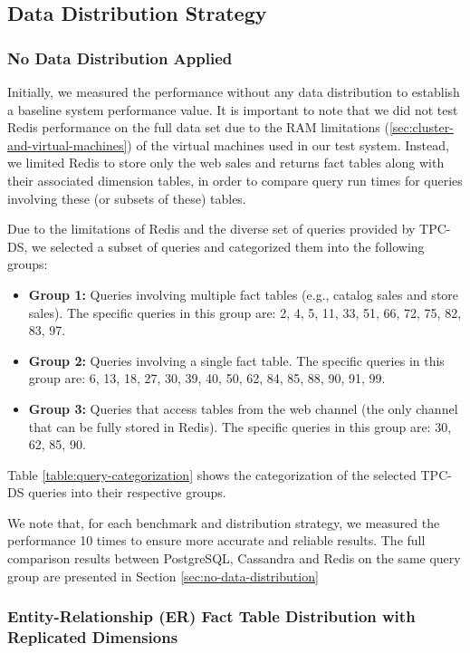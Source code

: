 \documentclass[conference]{IEEEtran}
\begin{document}
\subsection{Data Distribution Strategy}

\subsubsection{No Data Distribution Applied}

Initially, we measured the performance without any data distribution to establish a
baseline system performance value. It is important to note that we did not test
Redis performance on the full data set due to the RAM limitations
(\ref{sec:cluster-and-virtual-machines}) of the virtual machines used in our test system.
Instead, we limited Redis to store only the web sales and returns fact tables along with
their associated dimension tables, in order to compare query run times for queries
involving these (or subsets of these) tables.

Due to the limitations of Redis and the diverse set of queries provided by TPC-DS,
we selected a subset of queries and categorized them into the following groups:

\begin{itemize}
	\item \textbf{Group 1:} Queries involving multiple fact tables (e.g., catalog sales and store sales). The specific queries in this group are: 2, 4, 5, 11, 33, 51, 66, 72, 75, 82, 83, 97.
	\item \textbf{Group 2:} Queries involving a single fact table. The specific queries in this group are: 6, 13, 18, 27, 30, 39, 40, 50, 62, 84, 85, 88, 90, 91, 99.
	\item \textbf{Group 3:} Queries that access tables from the web channel (the only channel that can be fully stored in Redis). The specific queries in this group are: 30, 62, 85, 90.
\end{itemize}

Table \ref{table:query-categorization} shows the categorization of the selected TPC-DS queries into their
respective groups.

We note that, for each benchmark and distribution strategy, we measured the performance 10 times
to ensure more accurate and reliable results.
The full comparison results between PostgreSQL, Cassandra and Redis on the same query group are presented in Section \ref{sec:no-data-distribution}

\subsubsection{Entity-Relationship (ER) Fact Table Distribution with Replicated Dimensions}
\label{sec:er-fact-table-distro}
\end{document}
